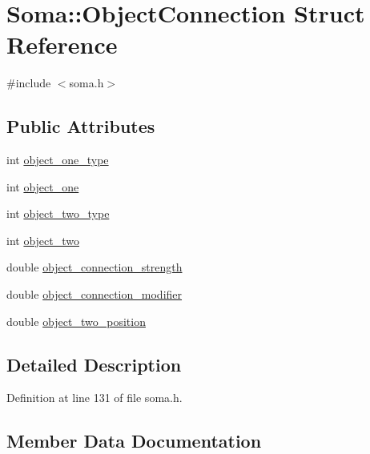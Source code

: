 \hypertarget{struct_soma_1_1_object_connection}{}\section{Soma\+:\+:Object\+Connection Struct Reference}
\label{struct_soma_1_1_object_connection}


{\ttfamily \#include $<$soma.\+h$>$}

\subsection*{Public Attributes}
\begin{DoxyCompactItemize}
\item 
int \hyperlink{struct_soma_1_1_object_connection_aa24770c082347464b35203cd65703386}{object\+\_\+one\+\_\+type}
\item 
int \hyperlink{struct_soma_1_1_object_connection_ab882c137a4c8414c3663e254ccf5c27d}{object\+\_\+one}
\item 
int \hyperlink{struct_soma_1_1_object_connection_a948d7e2d1db9b33d3fca95f249fb48c7}{object\+\_\+two\+\_\+type}
\item 
int \hyperlink{struct_soma_1_1_object_connection_a6a16f602b8206114618db99a45c99e6f}{object\+\_\+two}
\item 
double \hyperlink{struct_soma_1_1_object_connection_aa7973892dc2435b992a657a4c1e29eb3}{object\+\_\+connection\+\_\+strength}
\item 
double \hyperlink{struct_soma_1_1_object_connection_a55c6abf4a7906ee1ffede53b7fa36aa6}{object\+\_\+connection\+\_\+modifier}
\item 
double \hyperlink{struct_soma_1_1_object_connection_a00112b17c9f78d05c2d2e684f304ec03}{object\+\_\+two\+\_\+position}
\end{DoxyCompactItemize}


\subsection{Detailed Description}


Definition at line 131 of file soma.\+h.



\subsection{Member Data Documentation}
\mbox{\label{struct_soma_1_1_object_connection_a55c6abf4a7906ee1ffede53b7fa36aa6}} 
